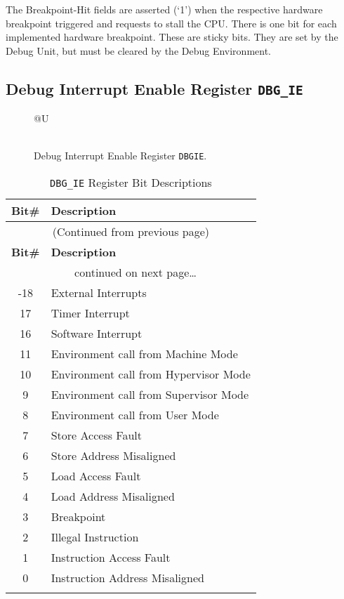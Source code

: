The Breakpoint-Hit fields are asserted (`1') when the respective
hardware breakpoint triggered and requests to stall the CPU. There is
one bit for each implemented hardware breakpoint. These are sticky bits.
They are set by the Debug Unit, but must be cleared by the Debug
Environment.

\subsection{Debug Interrupt Enable Register {\tt DBG\_IE}} \label{debug-interrupt-enable-register-dbg_ie}

\begin{figure*}[h!]
	{\footnotesize
		\begin{center}
			\begin{tabular}{@{}U}
				 \\
				\hline
				  \\
				\hline
			\end{tabular}
		\end{center}
	}
	\vspace{-0.1in}
	\caption{Debug Interrupt Enable Register {\tt DBGIE}.}
	\label{fig:dbgiereg}
\end{figure*}


\begin{longtable}[]{@{}cl@{}}
\toprule
\textbf{Bit\#} & \textbf{Description}\tabularnewline
\midrule
\endfirsthead
\multicolumn{2}{c}{{(Continued from previous page)}} \\
\toprule
\textbf{Bit\#} & \textbf{Description}\tabularnewline
\midrule
\endhead
\midrule \multicolumn{2}{c}{{\tablename\ \thetable{} continued on next page\ldots}} \\
\endfoot
\endlastfoot
31-18 & External Interrupts\tabularnewline
17 & Timer Interrupt\tabularnewline
16 & Software Interrupt\tabularnewline
11 & Environment call from Machine Mode\tabularnewline
10 & Environment call from Hypervisor Mode\tabularnewline
9 & Environment call from Supervisor Mode\tabularnewline
8 & Environment call from User Mode\tabularnewline
7 & Store Access Fault\tabularnewline
6 & Store Address Misaligned\tabularnewline
5 & Load Access Fault\tabularnewline
4 & Load Address Misaligned\tabularnewline
3 & Breakpoint\tabularnewline
2 & Illegal Instruction\tabularnewline
1 & Instruction Access Fault\tabularnewline
0 & Instruction Address Misaligned\tabularnewline
\bottomrule
\caption{\texttt{DBG\_IE} Register Bit Descriptions}
\label{tab:dbg-ie-reg-bits}
\end{longtable}


